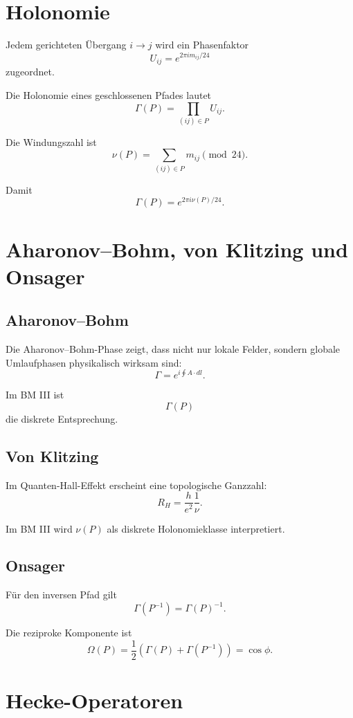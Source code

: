 \documentclass[11pt,a4paper]{article}
\theoremstyle{definition}
\begin{document}
	\section{Holonomie}
	
	Jedem gerichteten Übergang \(i\to j\) wird ein Phasenfaktor
	\[
	U_{ij}=e^{2\pi i m_{ij}/24}
	\]
	zugeordnet.
	
	Die Holonomie eines geschlossenen Pfades lautet
	\[
	\Gamma(P)=\prod_{(ij)\in P}U_{ij}.
	\]
	
	Die Windungszahl ist
	\[
	\nu(P)=\sum_{(ij)\in P}m_{ij}\pmod{24}.
	\]
	
	Damit
	\[
	\Gamma(P)=e^{2\pi i\nu(P)/24}.
	\]
	
	\section{Aharonov--Bohm, von Klitzing und Onsager}
	
	\subsection{Aharonov--Bohm}
	
	Die Aharonov--Bohm-Phase zeigt, dass nicht nur lokale Felder, sondern globale Umlaufphasen physikalisch wirksam sind:
	\[
	\Gamma=e^{i\oint A\cdot dl}.
	\]
	
	Im BM III ist
	\[
	\Gamma(P)
	\]
	die diskrete Entsprechung.
	
	\subsection{Von Klitzing}
	
	Im Quanten-Hall-Effekt erscheint eine topologische Ganzzahl:
	\[
	R_H=\frac{h}{e^2}\frac1\nu.
	\]
	
	Im BM III wird \(\nu(P)\) als diskrete Holonomieklasse interpretiert.
	
	\subsection{Onsager}
	
	Für den inversen Pfad gilt
	\[
	\Gamma(P^{-1})=\Gamma(P)^{-1}.
	\]
	
	Die reziproke Komponente ist
	\[
	\Omega(P)=\frac12\left(\Gamma(P)+\Gamma(P^{-1})\right)=\cos\phi.
	\]
	
	\section{Hecke-Operatoren}
	
\end{document}
